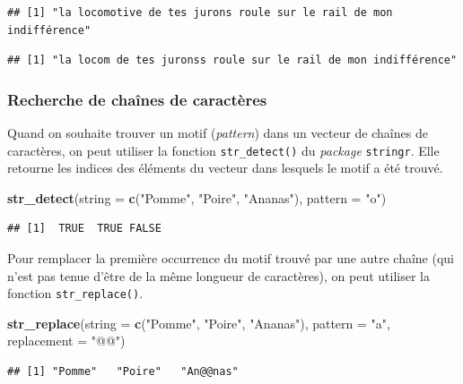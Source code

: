\documentclass[
  11pt,
]{book}
\newenvironment{Shaded}{\begin{snugshade}}{\end{snugshade}}
\newcommand{\DataTypeTok}[1]{\textcolor[rgb]{0.13,0.29,0.53}{#1}}
\newcommand{\KeywordTok}[1]{\textcolor[rgb]{0.13,0.29,0.53}{\textbf{#1}}}
\newcommand{\NormalTok}[1]{#1}
\newcommand{\StringTok}[1]{\textcolor[rgb]{0.31,0.60,0.02}{#1}}
\numberwithin{equation}{section}
\numberwithin{countremarque}{section}
\begin{document}
\begin{lstlisting}
## [1] "la locomotive de tes jurons roule sur le rail de mon indifférence"
\end{lstlisting}

\begin{lstlisting}
## [1] "la locom de tes juronss roule sur le rail de mon indifférence"
\end{lstlisting}

\hypertarget{manip-strings-regex}{%
\subsubsection{Recherche de chaînes de caractères}\label{manip-strings-regex}}

Quand on souhaite trouver un motif (\emph{pattern}) dans un vecteur de chaînes de caractères, on peut utiliser la fonction \texttt{str\_detect()} du \emph{package} \texttt{stringr}. Elle retourne les indices des éléments du vecteur dans lesquels le motif a été trouvé.

\begin{Shaded}
\begin{Highlighting}[]
\KeywordTok{str\_detect}\NormalTok{(}\DataTypeTok{string =} \KeywordTok{c}\NormalTok{(}\StringTok{"Pomme"}\NormalTok{, }\StringTok{"Poire"}\NormalTok{, }\StringTok{"Ananas"}\NormalTok{), }\DataTypeTok{pattern =} \StringTok{"o"}\NormalTok{)}
\end{Highlighting}
\end{Shaded}

\begin{lstlisting}
## [1]  TRUE  TRUE FALSE
\end{lstlisting}

Pour remplacer la première occurrence du motif trouvé par une autre chaîne (qui n'est pas tenue d'être de la même longueur de caractères), on peut utiliser la fonction \texttt{str\_replace()}.

\begin{Shaded}
\begin{Highlighting}[]
\KeywordTok{str\_replace}\NormalTok{(}\DataTypeTok{string =} \KeywordTok{c}\NormalTok{(}\StringTok{"Pomme"}\NormalTok{, }\StringTok{"Poire"}\NormalTok{, }\StringTok{"Ananas"}\NormalTok{), }\DataTypeTok{pattern =} \StringTok{"a"}\NormalTok{, }\DataTypeTok{replacement =} \StringTok{"@@"}\NormalTok{)}
\end{Highlighting}
\end{Shaded}

\begin{lstlisting}
## [1] "Pomme"   "Poire"   "An@@nas"
\end{lstlisting}
\end{document}
